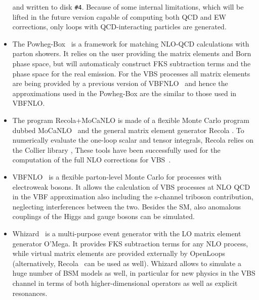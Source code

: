 \begin{itemize}
        and written to disk {\tt \#4}. Because of some internal limitations, which will be lifted in the future version capable of computing both QCD and EW corrections, 
        only loops with QCD-interacting particles are generated.
  \item The {\sc Powheg-Box}~\cite{Alioli:2010xd,Frixione:2007vw} is a framework for matching NLO-QCD calculations with parton showers.
It relies on the user providing the matrix elements and Born phase space, but will automaticaly construct FKS %
subtraction terms and the phase space for the real emission.
For the VBS processes all matrix elements are being provided by a previous version of {\sc VBFNLO}~\cite{Arnold:2008rz, Arnold:2011wj, Baglio:2014uba} and hence the approximations used in the {\sc Powheg-Box} are the similar to those used in {\sc VBFNLO}.

  \item The program {\sc Recola+MoCaNLO} is made of a flexible Monte Carlo program dubbed {\sc MoCaNLO}~\cite{MoCaNLO} and the general matrix element generator {\sc Recola} \cite{Actis:2012qn,Actis:2016mpe}.
To numerically evaluate the one-loop scalar and tensor integrals, {\sc Recola} relies on the {\sc Collier} library \cite{Denner:2014gla,Denner:2016kdg},
These tools have been successfully used for the computation of the full NLO corrections for VBS~\cite{Biedermann:2016yds,Biedermann:2017bss}.

  \item {\sc VBFNLO}~\cite{Arnold:2008rz, Arnold:2011wj, Baglio:2014uba} is a flexible
parton-level Monte Carlo for processes with electroweak bosons. It
allows the calculation of VBS processes at NLO QCD in the VBF
approximation also including the s-channel triboson contribution,
neglecting interferences between the two. Besides the SM, also anomalous
couplings of the Higgs and gauge bosons can be simulated.

  \item {\sc Whizard}~\cite{Moretti:2001zz,Kilian:2007gr} is a multi-purpose
event generator with the LO matrix element generator {\sc O'Mega}. It
provides FKS subtraction terms for any NLO process, while virtual matrix
elements are provided externally by {\sc
OpenLoops}~\cite{Cascioli:2011va} (alternatively, {\sc Recola}~\cite{Actis:2012qn,Actis:2016mpe}
can be used as well). {\sc Whizard} allows to simulate a
huge number of BSM models as well, in particular for new physics in
the VBS channel in terms of both higher-dimensional operators as well as explicit
resonances.

\end{itemize}

